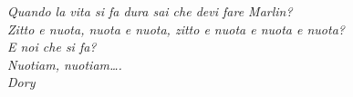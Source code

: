 \documentclass[a4paper,12pt, oneside]{book}
\begin{document}
\newcommand{\MYhref}[3][blue]{\href{#2}{\color{#1}{#3}}}%
\newcommand{\hiddenchapter}[1]{
  \stepcounter{chapter*}
  \chapter*{\arabic{chapter}\hspace{1em}{#1}}
}
\newcommand\xrowht[2][0]{\addstackgap[.5\dimexpr#2\relax]{\vphantom{#1}}}
\begin{titlepage}
  \begin{flushright}
    \textit{Quando la vita si fa dura sai che devi fare Marlin? \\ Zitto e nuota, nuota e nuota, zitto e nuota e nuota e nuota? \\ E noi che si fa? \\ Nuotiam, nuotiam…. \\   Dory }
  \end{flushright}
\end{titlepage}
\newpage
\end{document}
